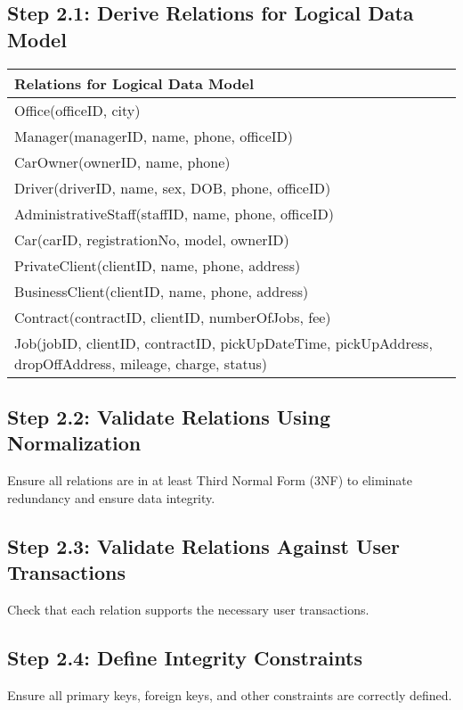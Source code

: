 \documentclass[a4paper,12pt]{article}
\begin{document}
\subsection*{Step 2.1: Derive Relations for Logical Data Model}
\begin{table}[ht]
\centering
\begin{tabularx}{\textwidth}{|X|X|}
\hline
\rowcolor{green!20} \textbf{Relations for Logical Data Model} \\
\hline
Office(officeID, city) \\
Manager(managerID, name, phone, officeID) \\
CarOwner(ownerID, name, phone) \\
Driver(driverID, name, sex, DOB, phone, officeID) \\
AdministrativeStaff(staffID, name, phone, officeID) \\
Car(carID, registrationNo, model, ownerID) \\
PrivateClient(clientID, name, phone, address) \\
BusinessClient(clientID, name, phone, address) \\
Contract(contractID, clientID, numberOfJobs, fee) \\
Job(jobID, clientID, contractID, pickUpDateTime, pickUpAddress, dropOffAddress, mileage, charge, status) \\
\hline
\end{tabularx}
\end{table}

\newpage

\subsection*{Step 2.2: Validate Relations Using Normalization}
Ensure all relations are in at least Third Normal Form (3NF) to eliminate redundancy and ensure data integrity.

\subsection*{Step 2.3: Validate Relations Against User Transactions}
Check that each relation supports the necessary user transactions.

\subsection*{Step 2.4: Define Integrity Constraints}
Ensure all primary keys, foreign keys, and other constraints are correctly defined.
\end{document}

